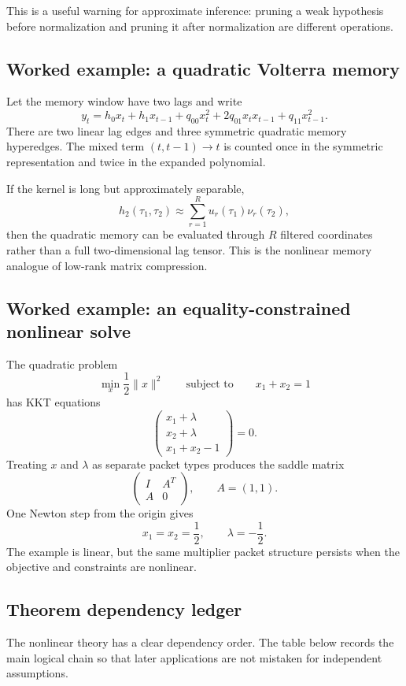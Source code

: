 \documentclass[11pt]{article}
\theoremstyle{definition}
\theoremstyle{remark}
\begin{document}
This is a useful warning for approximate inference: pruning a weak hypothesis before normalization and pruning it after normalization are different operations.

\subsection{Worked example: a quadratic Volterra memory}

Let the memory window have two lags and write
\[
y_t
=
h_0x_t+h_1x_{t-1}
+
q_{00}x_t^2
+2q_{01}x_tx_{t-1}
+q_{11}x_{t-1}^2.
\]
There are two linear lag edges and three symmetric quadratic memory hyperedges.  The mixed term $(t,t-1)\to t$ is counted once in the symmetric representation and twice in the expanded polynomial.

If the kernel is long but approximately separable,
\[
h_2(\tau_1,\tau_2)
\approx
\sum_{r=1}^R
u_r(\tau_1)\nu_r(\tau_2),
\]
then the quadratic memory can be evaluated through $R$ filtered coordinates rather than a full two-dimensional lag tensor.  This is the nonlinear memory analogue of low-rank matrix compression.

\subsection{Worked example: an equality-constrained nonlinear solve}

The quadratic problem
\[
\min_x\frac12\|x\|^2
\qquad
\text{subject to}
\qquad
x_1+x_2=1
\]
has KKT equations
\[
\begin{pmatrix}
x_1+\lambda\\
x_2+\lambda\\
x_1+x_2-1
\end{pmatrix}
=0.
\]
Treating $x$ and $\lambda$ as separate packet types produces the saddle matrix
\[
\begin{pmatrix}
I&A^T\\
A&0
\end{pmatrix},
\qquad
A=(1,1).
\]
One Newton step from the origin gives
\[
x_1=x_2=\frac12,
\qquad
\lambda=-\frac12.
\]
The example is linear, but the same multiplier packet structure persists when the objective and constraints are nonlinear.

\subsection{Theorem dependency ledger}

The nonlinear theory has a clear dependency order.  The table below records the main logical chain so that later applications are not mistaken for independent assumptions.
\end{document}
